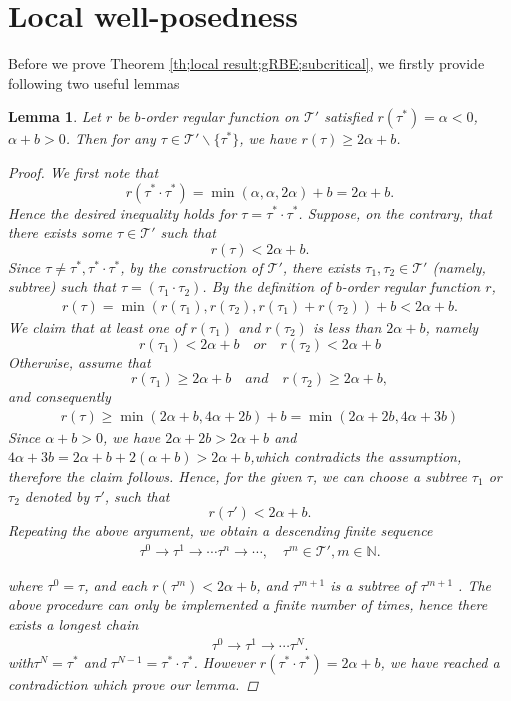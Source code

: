 \documentclass{article}
\newtheorem{lemma}{Lemma}[section]
\numberwithin{equation}{section}
\newcommand{\m}{\mathbb}
\newcommand{\ml}{\mathcal}
\begin{document}
\section{Local well-posedness}\label{sec;well-posedness}
\par Before we prove Theorem \ref{th;local result;gRBE;subcritical}, we firstly provide following two useful lemmas
\begin{lemma}\label{le;r;1}
	Let $r$ be $b$-order regular function on $\ml T'$ satisfied $r(\tau^*)=\alpha<0$, $\alpha+b>0$. Then for any $\tau\in \ml T'\backslash\{\tau^*\}$, we have $r(\tau)\geq 2\alpha +b$.
	\begin{proof} 
            We first note that  
            \[
r(\tau^*\cdot\tau^*)=
\min(\alpha,\alpha,2\alpha)+b
=2\alpha+b .
\]
Hence the desired inequality holds for $\tau=\tau^*\cdot \tau^*$. Suppose, on the contrary, that there exists some $\tau\in\ml T'$ such that
\[
r(\tau)<2\alpha+b.
\]
Since $\tau\neq \tau^*,\tau^*\cdot\tau^*$, by the construction of $\ml T'$, there exists $\tau_1,\tau_2\in\ml T'$ (namely, subtree) such that $\tau=(\tau_1\cdot\tau_2)$. By the definition of  $b$-order regular function $r$,
		\begin{align*}
			r(\tau)=\min(r(\tau_1),r(\tau_2),r(\tau_1)+r(\tau_2))+b<2\alpha+b.
		\end{align*}
		We claim that at least one of $r(\tau_1)$ and $r(\tau_2)$ is less than $2\alpha+b$, namely
        \[
        r(\tau_1) <2\alpha+b\quad  or\quad r(\tau_2) <2\alpha+b
        \]
       Otherwise, assume that 
       \[
       r(\tau_1)\geq2\alpha+b\quad and\quad r(\tau_2)\geq2\alpha+b,
       \]
       and consequently
		\begin{align*}
			r(\tau)\geq\min(2\alpha+b,4\alpha+2b)+b=\min (2\alpha+2b,4\alpha+3b)
		\end{align*}
		Since $\alpha+b>0$, we have $2\alpha+2b>2\alpha+b$ and $4\alpha+3b=2\alpha+b+2(\alpha+b)>2\alpha+b$,which contradicts the assumption, therefore the claim follows. Hence, for the given $\tau$, we can choose a subtree $\tau_1$ or $\tau_2$ denoted by $\tau'$, such that
        \[
        r(\tau')<2\alpha+b.
        \]
        Repeating the above argument, we obtain a descending finite sequence
		\begin{align*}
			\tau^0\to\tau^1\to\cdots \tau^n\to \cdots, \quad \tau^m\in\ml T',  m\in\m N.
		\end{align*}
		
       where $\tau^0=\tau$, and each $r(\tau^m)<2\alpha+b$, and $\tau^{m+1}$ is a subtree of $\tau^{m+1}$ . The above procedure can only be implemented a finite number of times, hence there exists a longest chain 
		\begin{align*}
			\tau^0\to\tau^1\to\cdots \tau^N.
		\end{align*}
	with$\tau^N=\tau^*$ and $\tau^{N-1}=\tau^*\cdot \tau^*$. However $r(\tau^*\cdot \tau^*)=2\alpha+b$, we have reached a contradiction which prove our lemma.
	\end{proof}
\end{lemma}
\end{document}
